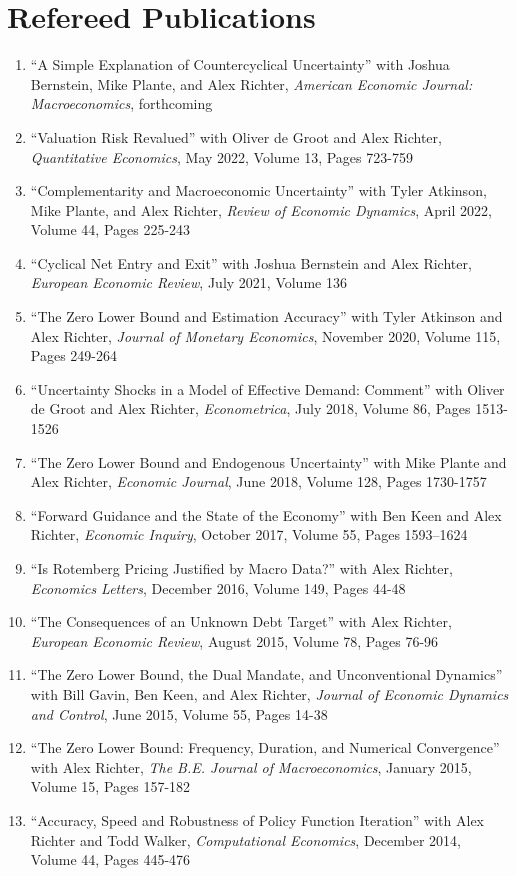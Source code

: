\documentclass[10pt,letterpaper,en-US]{article}
\begin{document}
\section*{Refereed Publications}
\begin{enumerate}
\item ``A Simple Explanation of Countercyclical Uncertainty'' with Joshua Bernstein, Mike Plante, and Alex Richter, \emph{American Economic Journal: Macroeconomics}, forthcoming
\item ``Valuation Risk Revalued'' with Oliver de Groot and Alex Richter, \emph{Quantitative Economics}, May 2022, Volume 13, Pages 723-759
\item ``Complementarity and Macroeconomic Uncertainty'' with Tyler Atkinson, Mike Plante, and Alex Richter, \emph{Review of Economic Dynamics}, April 2022, Volume 44, Pages 225-243
\item ``Cyclical Net Entry and Exit'' with Joshua Bernstein and Alex Richter, \emph{European Economic Review}, July 2021, Volume 136
\item ``The Zero Lower Bound and Estimation Accuracy'' with Tyler Atkinson and Alex Richter, \emph{Journal of Monetary Economics}, November 2020, Volume 115, Pages 249-264
\item ``Uncertainty Shocks in a Model of Effective Demand: Comment'' with Oliver de Groot and Alex Richter, \emph{Econometrica}, July 2018, Volume 86, Pages 1513-1526
\item ``The Zero Lower Bound and Endogenous Uncertainty'' with Mike Plante and Alex Richter, \emph{Economic Journal}, June 2018, Volume 128, Pages 1730-1757
\item ``Forward Guidance and the State of the Economy'' with Ben Keen and Alex Richter, \emph{Economic Inquiry}, October 2017, Volume 55, Pages 1593–1624
\item ``Is Rotemberg Pricing Justified by Macro Data?'' with Alex Richter, \emph{Economics Letters}, December 2016, Volume 149, Pages 44-48
\item ``The Consequences of an Unknown Debt Target'' with Alex Richter, \emph{European Economic Review}, August 2015, Volume 78, Pages 76-96
\item ``The Zero Lower Bound, the Dual Mandate, and Unconventional Dynamics'' with Bill Gavin, Ben Keen, and Alex Richter, \emph{Journal of Economic Dynamics and Control}, June 2015, Volume 55, Pages 14-38
\item ``The Zero Lower Bound: Frequency, Duration, and Numerical Convergence'' with Alex Richter, \emph{The B.E. Journal of Macroeconomics}, January 2015, Volume 15, Pages 157-182
\item ``Accuracy, Speed and Robustness of Policy Function Iteration'' with Alex Richter and Todd Walker, \emph{Computational Economics}, December 2014, Volume 44, Pages 445-476
\end{enumerate}
\end{document}
